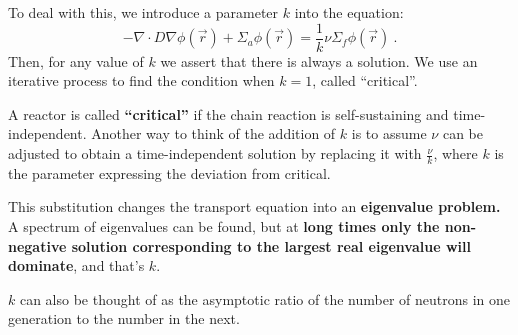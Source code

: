 \documentclass[12pt]{article}
\begin{document}
To deal with this, we introduce a parameter $k$ into the equation:
%
\begin{equation}
-\nabla \cdot D\nabla \phi(\vec{r}) + 
\Sigma_a \phi(\vec{r}) = \frac{1}{k}\nu \Sigma_f \phi(\vec{r})\:. \nonumber
\end{equation}
%
Then, for any value of $k$ we assert that there is always a solution. We use an iterative process to find the condition when $k=1$, called ``critical''.

A reactor is called \textbf{``critical''} if the chain reaction is self-sustaining and time-independent. Another way to think of the addition of $k$ is to assume $\nu$ can be adjusted to obtain a time-independent solution by replacing it with $\frac{\nu}{k}$, where $k$ is the parameter expressing the deviation from critical. 

This substitution changes the transport equation into an \textbf{eigenvalue problem.} A spectrum of eigenvalues can be found, but at \textbf{long times only the non-negative solution corresponding to the largest real eigenvalue will dominate}, and that's $k$. 

$k$ can also be thought of as the asymptotic ratio of the number of neutrons in one generation to the number in the next.
\end{document}
